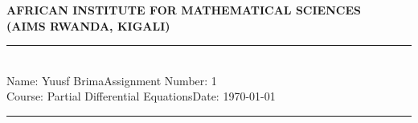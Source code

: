 \documentclass[12pt,a4paper]{article}
\newcommand{\student}{Yuusf Brima}
\newcommand{\course}{Partial Differential Equations}
\newcommand{\assignment}{1}
\begin{document}
\thispagestyle{empty}
\begin{center}
\textbf{AFRICAN INSTITUTE FOR MATHEMATICAL SCIENCES \\[0.5cm]
(AIMS RWANDA, KIGALI)}
\vspace{1.0cm}
\end{center}

\noindent
\rule{17cm}{0.2cm}\\[0.3cm]
Name: \student \hfill Assignment Number: \assignment\\[0.1cm]
Course: \course \hfill Date: \today\\
\rule{17cm}{0.05cm}
\vspace{1.0cm}
\end{document}
